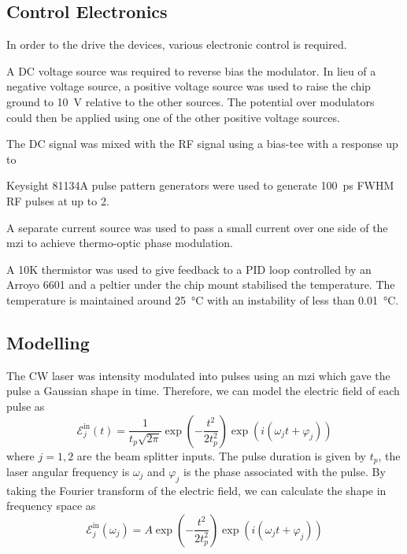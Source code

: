 \subsection{Control Electronics}

In order to the drive the devices, various electronic control is required. 

A DC voltage source was required to reverse bias the modulator. In lieu of a negative voltage source, a positive voltage source was used to raise the chip ground to \SI{10}{\V} relative to the other sources. The potential over modulators could then be applied using one of the other positive voltage sources.

The DC signal was mixed with the RF signal using a bias-tee with a response up to 

Keysight 81134A pulse pattern generators were used to generate \SI{100}{\ps} \ac{FWHM} RF pulses at up to \SI{2}{\Vpp}.

A separate current source was used to pass a small current over one side of the \ac{mzi} to achieve thermo-optic phase modulation. 

A 10K thermistor was used to give feedback to a PID loop controlled by an Arroyo 6601 and a peltier under the chip mount stabilised the temperature. The temperature is maintained around \SI{25}{\celsius} with an instability of less than \SI{0.01}{\celsius}. 

\subsection{Modelling}

The \ac{CW} laser was intensity modulated into pulses using an \ac{mzi} which gave the pulse a Gaussian shape in time. Therefore, we can model the electric field of each pulse as
\begin{equation}
	\mathcal{E}_j^\text{in}(t) = \frac{1}{t_p\sqrt{2\pi}} \exp{\left(-\frac{t^2}{2 t_p^2}\right)} \exp{\left(i(\omega_j t + \varphi_j)\right)}
\end{equation}
where $j = 1,2$ are the beam splitter inputs. The pulse duration is given by $t_p$, the laser angular frequency is $\omega_j$ and $\varphi_j$ is the phase associated with the pulse. By taking the Fourier transform of the electric field, we can calculate the shape in frequency space as 
\begin{equation}
	\mathcal{E}_j^\text{in}(\omega_j) = A \exp{\left(-\frac{t^2}{2 t_p^2}\right)} \exp{\left(i(\omega_j t + \varphi_j)\right)}
\end{equation}

